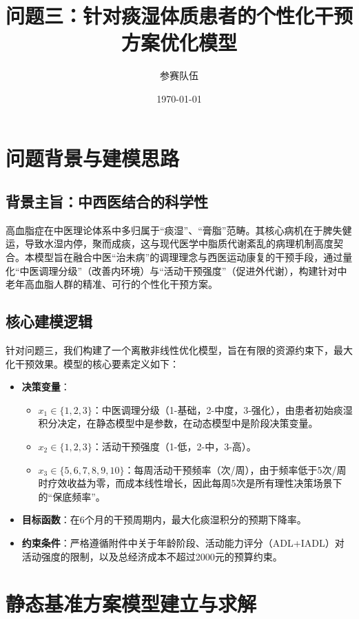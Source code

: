 \documentclass[12pt,a4paper]{article}
\title{问题三：针对痰湿体质患者的个性化干预方案优化模型}
\author{参赛队伍}
\date{\today}
\begin{document}
\maketitle

\section{问题背景与建模思路}

\subsection{背景主旨：中西医结合的科学性}
高血脂症在中医理论体系中多归属于“痰湿”、“膏脂”范畴。其核心病机在于脾失健运，导致水湿内停，聚而成痰，这与现代医学中脂质代谢紊乱的病理机制高度契合。本模型旨在融合中医“治未病”的调理理念与西医运动康复的干预手段，通过量化“中医调理分级”（改善内环境）与“活动干预强度”（促进外代谢），构建针对中老年高血脂人群的精准、可行的个性化干预方案。

\subsection{核心建模逻辑}
针对问题三，我们构建了一个离散非线性优化模型，旨在有限的资源约束下，最大化干预效果。模型的核心要素定义如下：
\begin{itemize}
    \item \textbf{决策变量}：
    \begin{itemize}
        \item $x_1 \in \{1, 2, 3\}$：中医调理分级（1-基础，2-中度，3-强化），由患者初始痰湿积分决定，在静态模型中是参数，在动态模型中是阶段决策变量。
        \item $x_2 \in \{1, 2, 3\}$：活动干预强度（1-低，2-中，3-高）。
        \item $x_3 \in \{5,6,7,8,9,10\}$：每周活动干预频率（次/周），由于频率低于5次/周时疗效收益为零，而成本线性增长，因此每周5次是所有理性决策场景下的“保底频率”。
    \end{itemize}
    \item \textbf{目标函数}：在6个月的干预周期内，最大化痰湿积分的预期下降率。
    \item \textbf{约束条件}：严格遵循附件中关于年龄阶段、活动能力评分（ADL+IADL）对活动强度的限制，以及总经济成本不超过2000元的预算约束。
\end{itemize}

\section{静态基准方案模型建立与求解}
\end{document}
